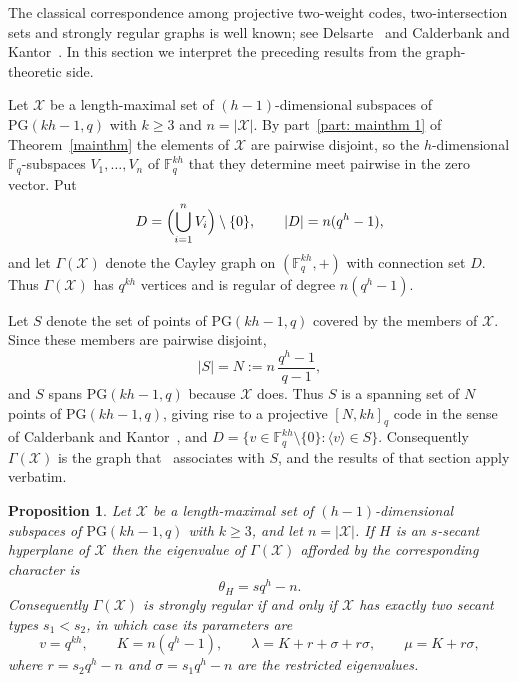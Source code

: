 \documentclass[12pt, twoside]{article}
\newtheorem{prop}[theorem]{\bf Proposition}
\begin{document}
	The classical correspondence among projective two-weight codes, two-intersection sets and strongly regular graphs is well known; see Delsarte~\cite{Del} and Calderbank and Kantor~\cite{CK}. In this section we interpret the preceding results from the graph-theoretic side.

	Let $\mathcal{X}$ be a length-maximal set of $(h-1)$-dimensional subspaces of $\mathrm{PG}(kh-1,q)$ with $k\ge3$ and $n=|\mathcal{X}|$. By part~\ref{part: mainthm 1} of Theorem~\ref{mainthm} the elements of $\mathcal{X}$ are pairwise disjoint, so the $h$-dimensional $\mathbb{F}_q$-subspaces $V_1,\ldots,V_n$ of $\mathbb{F}_q^{kh}$ that they determine meet pairwise in the zero vector. Put
	$$
	D=\Bigl(\bigcup_{i=1}^{n} V_i\Bigr)\setminus\{0\},\qquad |D|=n(q^h-1),
	$$
	and let $\Gamma(\mathcal{X})$ denote the Cayley graph on $(\mathbb{F}_q^{kh},+)$ with connection set $D$. Thus $\Gamma(\mathcal{X})$ has $q^{kh}$ vertices and is regular of degree $n(q^h-1)$.

	Let $S$ denote the set of points of $\mathrm{PG}(kh-1,q)$ covered by the members of $\mathcal{X}$. Since these members are pairwise disjoint,
	$$
	|S|=N:=n\,\frac{q^h-1}{q-1},
	$$
	and $S$ spans $\mathrm{PG}(kh-1,q)$ because $\mathcal{X}$ does. Thus $S$ is a spanning set of $N$ points of $\mathrm{PG}(kh-1,q)$, giving rise to a projective $[N,kh]_q$ code in the sense of Calderbank and Kantor~\cite[Section~2]{CK}, and $D=\{v\in\mathbb{F}_q^{kh}\setminus\{0\}:\langle v\rangle\in S\}$. Consequently $\Gamma(\mathcal{X})$ is the graph that~\cite[Section~3]{CK} associates with $S$, and the results of that section apply verbatim.

	\begin{prop}\label{prop: srg}
		Let $\mathcal{X}$ be a length-maximal set of $(h-1)$-dimensional subspaces of $\mathrm{PG}(kh-1,q)$ with $k\ge3$, and let $n=|\mathcal{X}|$. If $H$ is an $s$-secant hyperplane of $\mathcal{X}$ then the eigenvalue of $\Gamma(\mathcal{X})$ afforded by the corresponding character is
		$$
		\theta_H=sq^h-n.
		$$
		Consequently $\Gamma(\mathcal{X})$ is strongly regular if and only if $\mathcal{X}$ has exactly two secant types $s_1<s_2$, in which case its parameters are
		$$
		v=q^{kh},\qquad K=n(q^h-1),\qquad \lambda=K+r+\sigma+r\sigma,\qquad \mu=K+r\sigma,
		$$
		where $r=s_2q^h-n$ and $\sigma=s_1q^h-n$ are the restricted eigenvalues.
	\end{prop}
\end{document}
